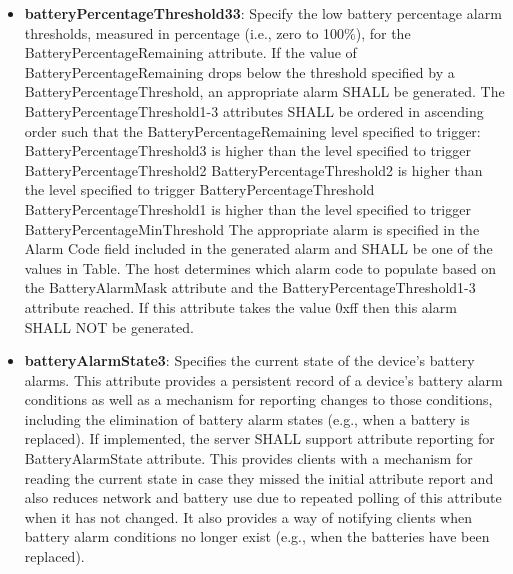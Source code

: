 \begin{itemize}
\item \textbf{batteryPercentageThreshold33}: Specify the low battery percentage alarm thresholds, measured in percentage (i.e., zero to 100\%), for the BatteryPercentageRemaining attribute. If the value of BatteryPercentageRemaining drops below the threshold specified by a BatteryPercentageThreshold, an appropriate alarm SHALL be generated. The BatteryPercentageThreshold1-3 attributes SHALL be ordered in ascending order such that the BatteryPercentageRemaining level specified to trigger: BatteryPercentageThreshold3 is higher than the level specified to trigger BatteryPercentageThreshold2 BatteryPercentageThreshold2 is higher than the level specified to trigger BatteryPercentageThreshold BatteryPercentageThreshold1 is higher than the level specified to trigger BatteryPercentageMinThreshold The appropriate alarm is specified in the Alarm Code field included in the generated alarm and SHALL be one of the values in Table. The host determines which alarm code to populate based on the BatteryAlarmMask attribute and the BatteryPercentageThreshold1-3 attribute reached. If this attribute takes the value 0xff then this alarm SHALL NOT be generated.
\item \textbf{batteryAlarmState3}: Specifies the current state of the device's battery alarms. This attribute provides a persistent record of a device's battery alarm conditions as well as a mechanism for reporting changes to those conditions, including the elimination of battery alarm states (e.g., when a battery is replaced). If implemented, the server SHALL support attribute reporting for BatteryAlarmState attribute. This provides clients with a mechanism for reading the current state in case they missed the initial attribute report and also reduces network and battery use due to repeated polling of this attribute when it has not changed. It also provides a way of notifying clients when battery alarm conditions no longer exist (e.g., when the batteries have been replaced).
\end{itemize}

